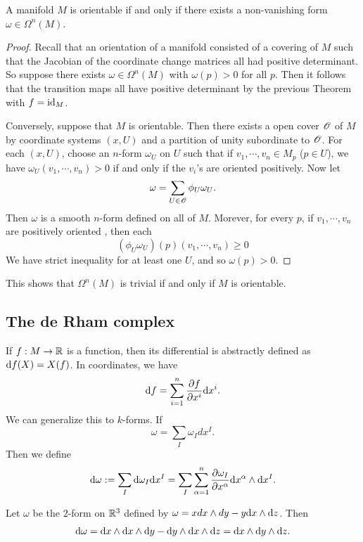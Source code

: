 \documentclass[11pt, english]{article}
\begin{document}
\begin{thm}
 A manifold $M$ is orientable if and only if there exists a non-vanishing form $\omega \in \Omega^n(M)$. 
\end{thm}
\begin{proof}
Recall that an orientation of a manifold consisted of a covering of $M$ such that the Jacobian of the coordinate change matrices all had positive determinant. So suppose there exists $\omega \in \Omega^n(M)$ with $\omega(p) > 0$ for all $p$. Then it follows that the transition maps all have positive determinant by the previous Theorem with $f=\text{id}_M$.

Conversely, suppose that $M$ is orientable. Then there exists a open cover $\operatorname{\mathscr{O}}$ of $M$ by coordinate systems $(x,U)$ and a partition of unity subordinate to $\operatorname{\mathscr{O}}$. For each $(x,U)$, choose an $n$-form $\omega_U$ on $U$ such that if $v_1,\cdots,v_n \in M_p$ ($p \in U$), we have $\omega_U(v_1,\cdots,v_n) > 0$ if and only if the $v_i$'s are oriented positively. Now let 
\[
\omega = \sum_{U \in \operatorname{\mathscr{O}}} \phi_U \omega_U.
\]
Then $\omega$ is a smooth $n$-form defined on all of $M$. Morever, for every $p$, if $v_1,\cdots,v_n$ are positively oriented , then each 
\[
(\phi_U \omega_U)(p)(v_1,\cdots,v_n) \geq 0
\]
We have strict inequality for at least one $U$, and so $\omega(p) > 0$.
\end{proof}

\begin{remark}
  This shows that $\Omega^n(M)$ is trivial if and only if $M$ is orientable.
\end{remark}

\subsection{The de Rham complex}
If $f:M \to \mathbb{R}$ is a function, then its differential is abstractly defined as $\mathrm{d}{f}(X)=X(f)$. In coordinates, we have
\[
\mathrm{d}{f} = \sum_{i=1}^n \frac{\partial {f}}{\partial {x^i}} \mathrm{d}{x}^i.
\]
We can generalize this to $k$-forms.
If
\[
\omega = \sum_I \omega_I dx^I.
\]
Then we define
\[
\mathrm{d}{\omega} := \sum_I \mathrm{d}{\omega} _I \mathrm{d}{x}^I = \sum_I \sum_{\alpha=1}^n \frac{\partial {\omega_I}}{\partial {x^\alpha}} \mathrm{d}{x}^\alpha \wedge \mathrm{d}{x}^I .
\]

\begin{example}
Let $\omega$ be the $2$-form on $\mathbb{R}^3$ defined by $\omega = x dx \wedge dy -y \mathrm{d}{x} \wedge \mathrm{d}{z}$. Then
\[
\mathrm{d}{\omega} = \mathrm{d}{x} \wedge \mathrm{d}{x} \wedge \mathrm{d}{y} - \mathrm{d}{y} \wedge \mathrm{d}{x} \wedge \mathrm{d}{z} = \mathrm{d}{x} \wedge \mathrm{d}{y} \wedge \mathrm{d}{z}.
\]
\end{example}
\end{document}

